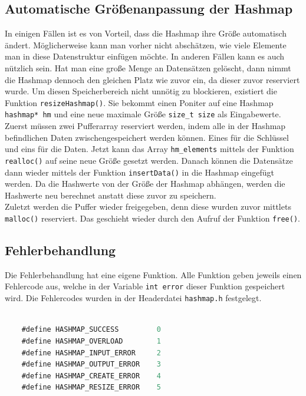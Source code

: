 \documentclass[11pt,a4paper]{article}
\begin{document}
\subsection{Automatische Größenanpassung der Hashmap}

In einigen Fällen ist es von Vorteil, dass die Hashmap ihre Größe automatisch ändert. Möglicherweise kann man vorher nicht abschätzen, wie viele Elemente 
man in diese Datenstruktur einfügen möchte. In anderen Fällen kann es auch nützlich sein. Hat man eine große Menge an Datensätzen gelöscht, dann nimmt die 
Hashmap dennoch den gleichen Platz wie zuvor ein, da dieser zuvor reserviert wurde. Um diesen Speicherbereich nicht unnötig zu blockieren, existiert die Funktion 
\lstinline{resizeHashmap()}. Sie bekommt einen Poniter auf eine Hashmap \lstinline{hashmap* hm} und eine neue maximale Größe \lstinline{size_t size} als Eingabewerte.\\
Zuerst müssen zwei Pufferarray reserviert werden, indem alle in der Hashmap befindlichen Daten zwischengespeichert werden können. Eines für die Schlüssel und eins für die Daten.
Jetzt kann das Array \lstinline{hm_elements} mittels der Funktion \lstinline{realloc()} auf seine neue Größe gesetzt werden.
Danach können die Datensätze dann wieder mittels der Funktion \lstinline{insertData()} in die Hashmap eingefügt werden. Da die Hashwerte von der Größe der Hashmap abhängen, 
werden die Hashwerte neu berechnet anstatt diese zuvor zu speichern.\\
Zuletzt werden die Puffer wieder freigegeben, denn diese wurden zuvor mittlets \lstinline{malloc()} reserviert. Das geschieht wieder durch den Aufruf der Funktion \lstinline{free()}.

\subsection{Fehlerbehandlung}

Die Fehlerbehandlung hat eine eigene Funktion. Alle Funktion geben jeweils einen Fehlercode aus, welche in der Variable \lstinline{int error} dieser Funktion gespeichert wird.
Die Fehlercodes wurden in der Headerdatei \lstinline{hashmap.h} festgelegt.\\

\begin{lstlisting}[language=C]
    
    #define HASHMAP_SUCCESS         0  
    #define HASHMAP_OVERLOAD        1  
    #define HASHMAP_INPUT_ERROR     2  
    #define HASHMAP_OUTPUT_ERROR    3  
    #define HASHMAP_CREATE_ERROR    4  
    #define HASHMAP_RESIZE_ERROR    5 

\end{lstlisting}
\end{document}
